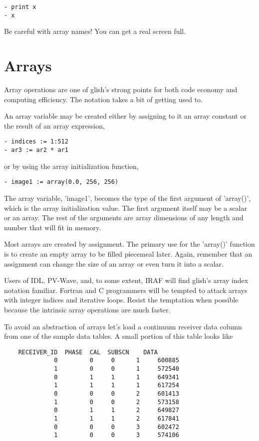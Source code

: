 \begin{verbatim}
- print x
- x
\end{verbatim}

Be careful with array names!  You can get a real screen full.

\section{Arrays}

    Array operations are one of glish's strong points for both code economy
and computing efficiency.  The notation takes a bit of getting used to.

    An array variable may be created either by assigning to it an array
constant or the result of an array expression,

\begin{verbatim}
- indices := 1:512
- ar3 := ar2 * ar1
\end{verbatim}

or by using the array initialization function,

\begin{verbatim}
- image1 := array(0.0, 256, 256)
\end{verbatim}

The array variable, 'image1', becomes the type of the first argument of
'array()', which is the array initialization value.  The first argument
itself may be a scalar or an array.  The rest of the arguments are array
dimensions of any length and number that will fit in memory.

    Most arrays are created by assignment.  The primary use for the
'array()' function is to create an empty array to be filled piecemeal
later.  Again, remember that an assignment can change the size of an array
or even turn it into a scalar.

    Users of IDL, PV-Wave, and, to some extent, IRAF will find glish's
array index notation familiar.  Fortran and C programmers will be tempted
to attack arrays with integer indices and iterative loops.  Resist the
temptation when possible because the intrinsic array operations are much
faster.

    To avoid an abstraction of arrays let's load a continuum receiver data
column from one of the sample data tables.  A small portion of this table
looks like

\begin{verbatim}
	RECEIVER_ID  PHASE  CAL  SUBSCN    DATA
              0         0     0      1     600885
              1         0     0      1     572540
              0         1     1      1     649341
              1         1     1      1     617254
              0         0     0      2     601413
              1         0     0      2     573158
              0         1     1      2     649827
              1         1     1      2     617841
              0         0     0      3     602472
              1         0     0      3     574106
\end{verbatim}


